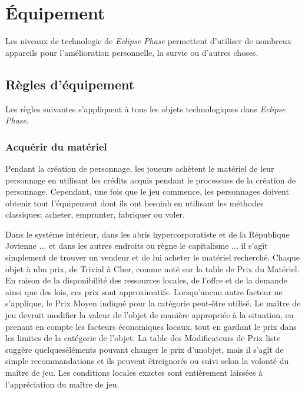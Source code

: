 
\chapter{Équipement} \label{cha:gear} 

Les niveaux de technologie de \emph{Eclipse Phase} permettent d'utiliser de nombreux appareils pour l'amélioration personnelle, la survie ou d'autres choses. 

\section{Règles d'équipement} \label{sec:equipment-rules} 

Les règles suivantes s'appliquent à tous les objets technologiques dans \emph{Eclipse Phase}. 

\subsection{Acquérir du matériel} \label{sec:acquiring-gear} 

Pendant la création de personnage, les joueurs achètent le matériel de leur personnage en utilisant les crédits acquis pendant le processuss de la création de personnage. Cependant, une fois que le jeu commence, les personnages doivent obtenir tout l'équipement dont ils ont besoinb en utilisant les méthodes classiques: acheter, emprunter, fabriquer ou voler. 

Dans le système intérieur, dans les abris hypercorporatiste et de la République Jovienne ... et dans les autres endroits ou règne le capitalisme ... il s'agît simplement de trouver un vendeur et de lui acheter le matériel recherché. Chaque objet à ubn prix, de Trivial à Cher, comme noté sur la table de Prix du Matériel. En raison de la disponibilité des ressources locales, de l'offre et de la demande ainsi que des lois, ces prix sont approximatifs.  Lorsqu'aucun autre facteur ne s'applique, le Prix Moyen indiqué pour la catégorie peut-être utilisé. Le maître de jeu devrait modifier la valeur de l'objet de manière appropriée à la situation, en prenant en compte les facteurs économiques locaux, tout en gardant le prix dans les limites de la catégorie de l'objet. La table des Modificateurs de Prix liste suggère quelqueséléments pouvant changer le prix d'unobjet, mais il s'agît de simple recommandations et ils peuvent êtreignorés ou suivi selon la volonté du maître de jeu. Les conditions locales exactes sont entièrement laissées à l'appréciation du maître de jeu. 


